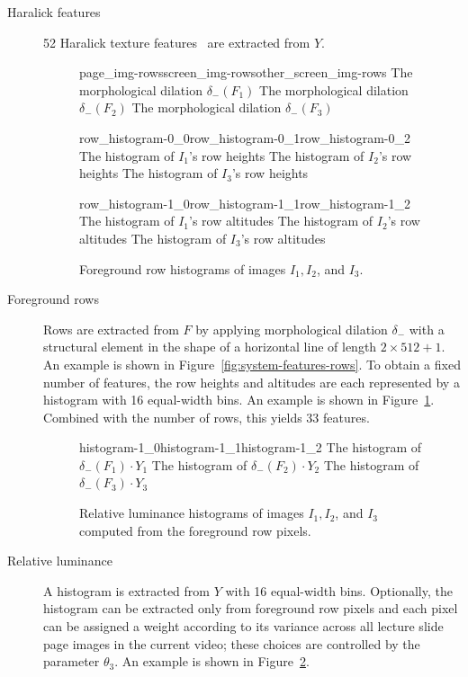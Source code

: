 \begin{description}
  \item[Haralick features]
    52 Haralick texture features~\cite{haralick1973textural} are extracted from $Y$.

  \begin{figure}
      {page_img-rows}{screen_img-rows}{other_screen_img-rows}%
      {The morphological dilation $\delta_{{}-{}}(F_1)$}%
      {The morphological dilation $\delta_{{}-{}}(F_2)$}%
      {The morphological dilation $\delta_{{}-{}}(F_3)$}
    \caption{Foreground rows of images $I_1,I_2$, and $I_3$.}
    \label{fig:system-features-rows}

    \kern\floatsep
    {\setlength{\fboxrule}{0pt}%
       {row_histogram-0_0}{row_histogram-0_1}{row_histogram-0_2}%
       {The histogram of $I_1$'s row heights}%
       {The histogram of $I_2$'s row heights}%
       {The histogram of $I_3$'s row heights}\par
       {row_histogram-1_0}{row_histogram-1_1}{row_histogram-1_2}%
       {The histogram of $I_1$'s row altitudes}%
       {The histogram of $I_2$'s row altitudes}%
       {The histogram of $I_3$'s row altitudes}}
    \caption{Foreground row histograms of images $I_1,I_2$, and $I_3$.}
    \label{fig:system-features-row-histograms}
  \end{figure}
  \item[Foreground rows]
    Rows are extracted from $F$ by applying morphological dilation $\delta_{{}-{}}$ with
    a structural element in the shape of a horizontal line of length $2\times
    512+1$. An example is shown in Figure~\ref{fig:system-features-rows}.
    To obtain a fixed number of features, the row heights and altitudes are each
    represented by a histogram with 16 equal-width bins. An example is shown in
    Figure~\ref{fig:system-features-row-histograms}. Combined with the number
    of rows, this yields 33 features.

  \begin{figure}
    {\setlength{\fboxrule}{0pt}%
       {histogram-1_0}{histogram-1_1}{histogram-1_2}%
       {The histogram of $\delta_{{}-{}}(F_1)\cdot Y_1$}%
       {The histogram of $\delta_{{}-{}}(F_2)\cdot Y_2$}%
       {The histogram of $\delta_{{}-{}}(F_3)\cdot Y_3$}}
    \caption{Relative luminance histograms of images $I_1,I_2$, and $I_3$ computed from
      the foreground row pixels.}
    \label{fig:system-features-relative-luminance}
  \end{figure}
  \item[Relative luminance]
    A histogram is extracted from $Y$ with 16 equal-width bins. Optionally, the
    histogram can be extracted only from foreground row pixels and each pixel
    can be assigned a weight according to its variance across all lecture slide
    page images in the current video; these choices are controlled by the
    parameter $\theta_3$. An example is shown in
    Figure~\ref{fig:system-features-relative-luminance}.
\end{description}

